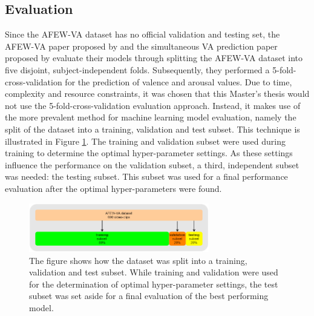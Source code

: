 \subsection{Evaluation} \label{sec:TrainValTestSplit}
Since the AFEW-VA dataset has no official validation and testing set, the AFEW-VA paper proposed by \citet{Kossaifi:2017:AFEW-VADatabase} and the simultaneous VA prediction paper proposed by \citet{Handrich:2020:SimultaneousPredVA} evaluate their models through splitting the AFEW-VA dataset into five disjoint, subject-independent folds. Subsequently, they performed a 5-fold-cross-validation for the prediction of valence and arousal values. 
\newline\newline
Due to time, complexity and resource constraints, it was chosen that this Master's thesis would not use the 5-fold-cross-validation evaluation approach. Instead, it makes use of the more prevalent method for machine learning model evaluation, namely the split of the dataset into a training, validation and test subset. This technique is illustrated in Figure \ref{fig:TrainValTestSplit}. The training and validation subset were used during training to determine the optimal hyper-parameter settings. As these settings influence the performance on the validation subset, a third, independent subset was needed: the testing subset. This subset was used for a final performance evaluation after the optimal hyper-parameters were found.

\begin{figure}[H]
  \begin{center}
  \includegraphics[angle=0, width=0.7\textwidth]{Figures/TrainValTestSplit.png}
  \caption[Dataset training-validation-test split]{The figure shows how the dataset was split into a training, validation and test subset. While training and validation were used for the determination of optimal hyper-parameter settings, the test subset was set aside for a final evaluation of the best performing model.}
  \label{fig:TrainValTestSplit}
  \end{center}
\end{figure}

